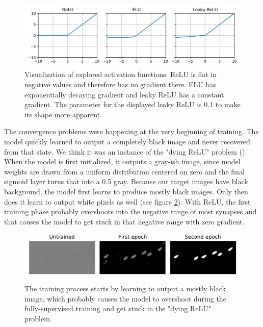 \begin{figure}[ht]
    \centering
    \includegraphics[width=140mm]{../../figures/03-activation-function/functions.pdf}
    \caption{Visualization of explored activation functions. ReLU is flat in negative values and therefore has no gradient there. ELU has exponentially decaying gradient and leaky ReLU has a constant gradient. The parameter for the displayed leaky ReLU is 0.1 to make its shape more apparent.}
    \label{fig:ActivationFunctions}
\end{figure}

The convergence problems were happening at the very beginning of training. The model quickly learned to output a completely black image and never recovered from that state. We think it was an instance of the "dying ReLU" problem (\cite{DyingRelu}). When the model is first initialized, it outputs a gray-ish image, since model weights are drawn from a uniform distribution centered on zero and the final sigmoid layer turns that into a 0.5 gray. Because our target images have black background, the model first learns to produce mostly black images. Only then does it learn to output white pixels as well (see figure \ref{fig:ActivationTrainingProgression}). With ReLU, the first training phase probably overshoots into the negative range of most synapses and that causes the model to get stuck in that negative range with zero gradient.

\begin{figure}[ht]
    \centering
    \includegraphics[width=140mm]{../../figures/03-activation-function/progression.pdf}
    \caption{The training process starts by learning to output a mostly black image, which probably causes the model to overshoot during the fully-supervised training and get stuck in the "dying ReLU" problem.}
    \label{fig:ActivationTrainingProgression}
\end{figure}

